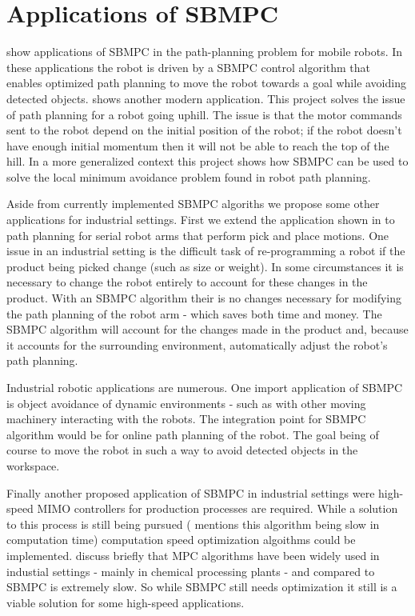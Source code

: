 \documentclass[main.tex]{subfile}
\begin{document}
\section{Applications of SBMPC} 
\label{sec:applications_of_sbmpc}

\cite{autoVehicle,auv} show applications of SBMPC in the path-planning problem
for mobile robots. In these applications the robot is driven by a SBMPC control
algorithm that enables optimized path planning to move the robot towards a goal
while avoiding detected objects. \cite{uphill} shows another modern application.
This project solves the issue of path planning for a robot going uphill. The
issue is that the motor commands sent to the robot depend on the initial
position of the robot; if the robot doesn't have enough initial momentum then it
will not be able to reach the top of the hill. In a more generalized context
this project shows how SBMPC can be used to solve the local minimum avoidance
problem found in robot path planning.

Aside from currently implemented SBMPC algoriths we propose some other
applications for industrial settings. First we extend the application shown in
\cite{uphill} to path planning for serial robot arms that perform pick and place
motions. One issue in an industrial setting is the difficult task of
re-programming a robot if the product being picked change (such as size or
weight). In some circumstances it is necessary to change the robot entirely to
account for these changes in the product. With an SBMPC algorithm their is no
changes necessary for modifying the path planning of the robot arm - which saves
both time and money. The SBMPC algorithm will account for the changes made in
the product and, because it accounts for the surrounding environment,
automatically adjust the robot's path planning.

Industrial robotic applications are numerous. One import application of SBMPC is
object avoidance of dynamic environments - such as with other moving machinery
interacting with the robots. The integration point for SBMPC algorithm would be
for online path planning of the robot. The goal being of course to move the
robot in such a way to avoid detected objects in the workspace. 

Finally another proposed application of SBMPC in industrial settings were
high-speed MIMO controllers for production processes are required. While a
solution to this process is still being pursued (\cite{autoVehicle} mentions
this algorithm being slow in computation time) computation speed optimization
algoithms could be implemented. \cite{uphill,auv} discuss briefly that MPC
algorithms have been widely used in industial settings - mainly in chemical
processing plants - and compared to SBMPC is extremely slow. So while SBMPC
still needs optimization it still is a viable solution for some high-speed
applications. 

\end{document}
